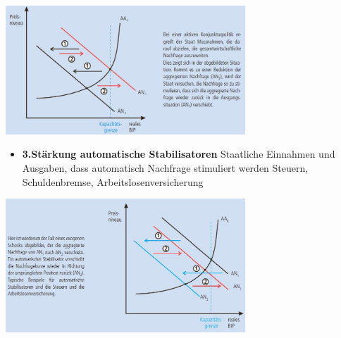 \begin{minipage}{9cm}
	\includegraphics[width=9cm]{images/keyne.jpg}
\end{minipage}
\begin{minipage}{10cm}
	\begin{itemize}
		\item \textbf{3.Stärkung automatische Stabilisatoren}
		\subitem Staatliche Einnahmen und Ausgaben, dass automatisch Nachfrage stimuliert werden
		\subitem Steuern, Schuldenbremse, Arbeitslosenversicherung
	\end{itemize}
\end{minipage}
\begin{minipage}{9cm}
	\includegraphics[width=9cm]{images/autostab.jpg}
\end{minipage}
\clearpage
